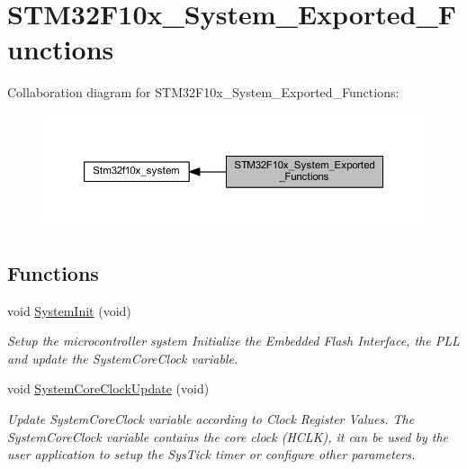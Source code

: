\hypertarget{group___s_t_m32_f10x___system___exported___functions}{}\section{S\+T\+M32\+F10x\+\_\+\+System\+\_\+\+Exported\+\_\+\+Functions}
\label{group___s_t_m32_f10x___system___exported___functions}
Collaboration diagram for S\+T\+M32\+F10x\+\_\+\+System\+\_\+\+Exported\+\_\+\+Functions\+:
\nopagebreak
\begin{figure}[H]
\begin{center}
\leavevmode
\includegraphics[width=350pt]{group___s_t_m32_f10x___system___exported___functions}
\end{center}
\end{figure}
\subsection*{Functions}
\begin{DoxyCompactItemize}
\item 
void \hyperlink{group___s_t_m32_f10x___system___exported___functions_ga93f514700ccf00d08dbdcff7f1224eb2}{System\+Init} (void)
\begin{DoxyCompactList}\small\item\em Setup the microcontroller system Initialize the Embedded Flash Interface, the P\+LL and update the System\+Core\+Clock variable. \end{DoxyCompactList}\item 
void \hyperlink{group___s_t_m32_f10x___system___exported___functions_gae0c36a9591fe6e9c45ecb21a794f0f0f}{System\+Core\+Clock\+Update} (void)
\begin{DoxyCompactList}\small\item\em Update System\+Core\+Clock variable according to Clock Register Values. The System\+Core\+Clock variable contains the core clock (H\+C\+LK), it can be used by the user application to setup the Sys\+Tick timer or configure other parameters. \end{DoxyCompactList}\end{DoxyCompactItemize}



